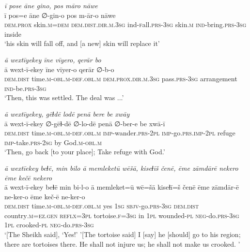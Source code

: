 \ea \label{DG.51}
\textit{ī pose āne gino, pos māro nāwe} \\ 
\gll ī pos=e āne ∅-gin-o pos m-ār-o nāwe \\ 
 \textsc{dem.prox} skin\textsc{.m}\textsc{=dem} \textsc{dem.dist}\textsc{.dir}\textsc{.m}\textsc{.3sg} ind\textsc{-f}all\textsc{.prs}\textsc{-3sg} skin\textsc{.m} \textsc{ind-}bring\textsc{.prs}\textsc{-3sg} inside \\ 
\glt `his skin will fall off, and [a new] skin will replace it'
\z 
 
\ea \label{DG.55}
\textit{ā wextīyekey īne vīyero, qerār bo} \\ 
\gll ā wext-ī-ekey īne vīyer-o qerār ∅-b-o \\ 
 \textsc{dem.dist} time\textsc{.m}\textsc{-obl}\textsc{.m}\textsc{-def}\textsc{.obl}\textsc{.m} \textsc{dem.prox}\textsc{.dir}\textsc{.m}\textsc{.3sg} pass\textsc{.prs}\textsc{-3sg} arrangement \textsc{ind-}be\textsc{.prs}\textsc{-3sg} \\ 
\glt `Then, this was settled. The deal was ...'
\z 
 
\ea \label{DG.58}
\textit{ā wextīyekey, gēɫdē lodē penā bere be xwāy} \\ 
\gll ā wext-ī-ekey ∅-gēɫ-dē ∅-lo-dē penā ∅-ber-e be xwā-ī \\ 
 \textsc{dem.dist} time\textsc{.m}\textsc{-obl}\textsc{.m}\textsc{-def}\textsc{.obl}\textsc{.m} \textsc{imp-}wander\textsc{.prs}\textsc{-2pl} \textsc{imp-}go\textsc{.prs}\textsc{.imp}\textsc{-2pl} refuge \textsc{imp-}take\textsc{.prs}-\textsc{2sg} by God\textsc{.m}\textsc{-obl}\textsc{.m} \\ 
\glt `Then, go back [to your place]; Take refuge with God.'
\z 
 
\ea \label{DG.64}
\textit{ā wextīekey beɫē, min bilo ā memleketū wēšā, kiseɫīš čenē, ēme zāmdārē nekero ēme kečē nekero} \\ 
\gll ā wext-ī-ekey beɫē min bi-l-o ā memleket=ū wē=šā kiseɫī=š čenē ēme zāmdār-ē ne-ker-o ēme keč-ē ne-ker-o \\ 
 \textsc{dem.dist} time\textsc{.m}\textsc{-obl}\textsc{.m}\textsc{-def}\textsc{.obl}\textsc{.m} yes \textsc{1sg} \textsc{sbjv-}go\textsc{.prs}\textsc{-3sg} \textsc{dem.dist} country\textsc{.m}\textsc{=ez}\textsc{.gen} \textsc{reflx}\textsc{=3pl} tortoise\textsc{\textsc{.f}}\textsc{=3sg} in \textsc{1pl} wounded\textsc{\textsc{-pl}} \textsc{neg-}do\textsc{.prs}\textsc{-3sg} \textsc{1pl} crooked\textsc{\textsc{-pl}} \textsc{neg-}do\textsc{.prs}\textsc{-3sg} \\ 
\glt `[The Sheikh said], ‘Yes!' '[The tortoise said] I [say] he [should] go to his region; there are tortoises there. He shall not injure us; he shall not make us crooked. '
\z 
 
